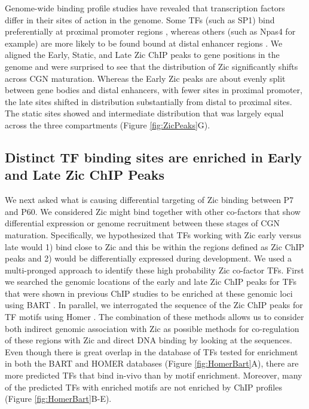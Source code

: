 \documentclass[fleqn,10pt]{wlscirep}
\begin{document}
Genome-wide binding profile studies have revealed that transcription factors differ in their sites of action in the genome. Some TFs (such as SP1) bind preferentially at proximal promoter regions \cite{}, whereas others (such as Npas4 for example) are more likely to be found bound at distal enhancer regions \cite{Kaczynski2003Sp1-Factors, Lyons2011MechanismsTranscription}. We aligned the Early, Static, and Late Zic ChIP peaks to gene positions in the genome and were surprised to see that the distribution of Zic significantly shifts across CGN maturation. Whereas the Early Zic peaks are about evenly split between gene bodies and distal enhancers, with fewer sites in proximal promoter, the late sites shifted in distribution substantially from distal to proximal sites. The static sites showed and intermediate distribution that was largely equal across the three compartments (Figure \ref{fig:ZicPeaks}G). 

\subsection*{Distinct TF binding sites are enriched in Early and Late Zic ChIP Peaks}
We next asked what is causing differential targeting of Zic binding between P7 and P60. We considered Zic might bind together with other co-factors that show differential expression or genome recruitment between these stages of CGN maturation. Specifically, we hypothesized that TFs working with Zic early versus late would 1) bind close to Zic and this be within the regions defined as Zic ChIP peaks and 2) would be differentially expressed during development. We used a  multi-pronged approach to identify these high probability Zic co-factor TFs. First we searched the genomic locations of the early and late Zic ChIP peaks for TFs that were shown in previous ChIP studies to be enriched at these genomic loci using BART \cite{Zhenjiawang2018BART:Profiles, Ma2021BARTweb:Analysis}. In parallel, we interrogated the sequence of the Zic ChIP peaks for TF motifs using Homer \cite{}. The combination of these methods allows us to consider both indirect genomic association with Zic as possible methods for co-regulation of these regions with Zic and direct DNA binding by looking at the sequences. Even though there is great overlap in the database of TFs tested for enrichment in both the BART and HOMER databases (Figure \ref{fig:HomerBart}A), there are more predicted TFs that bind in-vivo than by motif enrichment. Moreover, many of the predicted TFs with enriched motifs are not enriched by ChIP profiles (Figure \ref{fig:HomerBart}B-E).
\end{document}
